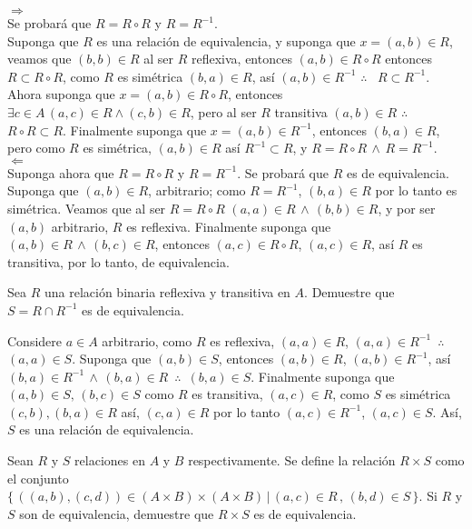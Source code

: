 \begin{sol}
    $\Rightarrow$ \\
    Se probará que $R=R\circ R$ y $R=R^{-1}$. \\
    Suponga que $R$ es una relación de equivalencia, y suponga que $x=(a,b) \in
    R$, veamos que $(b,b) \in R$ al ser $R$ reflexiva, entonces $(a,b) \in R
    \circ R$ entonces $R \subset R \circ R$, como $R$ es simétrica $(b,a) \in
    R$, así $(a,b) \in R^{-1}$ $\therefore$ \, $R \subset R^{-1}$. Ahora suponga que
    $x = (a,b) \in R\circ R$, entonces $\exists c \in A \, (a,c) \in R \land
    (c,b) \in R$, pero al ser $R$ transitiva $(a,b) \in R$ $\therefore$ \, $ R\circ R
    \subset R$. Finalmente suponga que $x=(a,b) \in R^{-1}$, entonces $(b,a) \in
    R$, pero como $R$ es simétrica, $(a,b)\in R$ así $R^{-1} \subset R$, y $R=R
    \circ R \, \land \, R = R^{-1}$. \\
    $\Leftarrow$ \\
    Suponga ahora que $R=R\circ R$ y $R=R^{-1}$. Se probará que $R$ es de
    equivalencia. \\
    Suponga que $(a,b) \in R$, arbitrario; como $R=R^{-1}$, $(b,a)\in R$ por lo tanto es
    simétrica. Veamos que al ser $R=R\circ R$ $(a,a) \in R \, \land \, (b,b)
    \in R$, y por ser $(a,b)$ arbitrario, $R$ es reflexiva. Finalmente suponga
    que $(a,b) \in R \, \land \, (b,c) \in R$, entonces $(a,c) \in R \circ R$,
    $(a,c)\in R$, así $R$ es transitiva, por lo tanto, de equivalencia.
\end{sol}
\begin{problem}
    Sea $R$ una relación binaria reflexiva y transitiva en $A$. Demuestre
    que $S = R \cap R^{-1}$ es de equivalencia.
\end{problem}
\begin{sol}
    Considere $a\in A$ arbitrario, como $R$ es reflexiva, $(a,a) \in R$,
    $(a,a) \in R^{-1}$ $\,\therefore \,$ $(a,a) \in S$. Suponga que
    $(a,b)\in S$, entonces $(a,b)\in R$, $(a,b) \in R^{-1}$, así $(b,a) \in
    R^{-1} \, \land \, (b,a) \in R$ $\, \therefore \,$ $(b,a) \in S$.
    Finalmente suponga que $(a,b)\in S, \, (b,c) \in S$ como $R$ es
    transitiva, $(a,c)\in R$, como $S$ es simétrica $(c,b), (b,a)\in R$ así,
    $(c,a) \in R$ por lo tanto $(a,c) \in R^{-1}$, $(a,c)\in S$. Así, $S$ es
    una relación de equivalencia.
\end{sol}
\begin{problem}
    Sean $R$ y $S$ relaciones en $A$ y $B$ respectivamente. Se define la
    relación $R \times S$ como el conjunto $\{ \, ((a,b),(c,d)) \in (A\times
    B) \times (A \times B) \, | \, (a,c) \in R \, , \, (b,d) \in S \,\}$. Si
    $R$ y $S$ son de equivalencia, demuestre que $R \times S$ es de
    equivalencia.
\end{problem}
